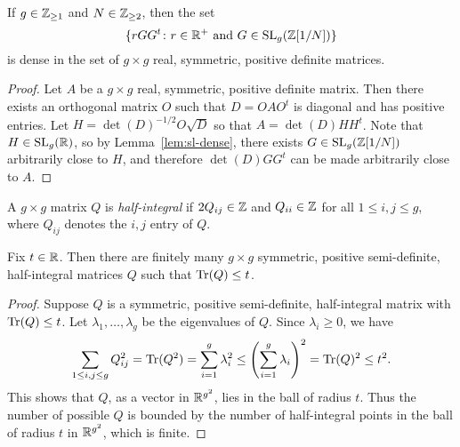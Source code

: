\documentclass{amsart}
\begin{document}
\begin{lemma}\label{lem:rggt-dense}
  If $g\in\mathbb{Z}_{\ge 1}$ and $N\in\mathbb{Z}_{\ge 2}$, then the set
\[
\{ rGG^t \colon r \in \mathbb{R}^+ \text{ and } G \in \operatorname{SL}_g(\mathbb{Z}[1/N]) \}
\]
is dense in the set of $g \times g$ real, symmetric, positive definite matrices.
\end{lemma}
\begin{proof}
  Let $A$ be a $g \times g$ real, symmetric, positive definite matrix. Then there exists an orthogonal matrix $O$ such that $D = OAO^t$ is diagonal and has positive entries. Let $H = \det(D)^{-1/2}O\sqrt{D}$ so that $A = \det(D)HH^t$. Note that $H \in \operatorname{SL}_g(\mathbb{R})$, so by Lemma~\ref{lem:sl-dense}, there exists $G \in \operatorname{SL}_g(\mathbb{Z}[1/N])$ arbitrarily close to $H$, and therefore $\det(D)GG^t$ can be made arbitrarily close to $A$.
\end{proof}

\begin{definition}
  A $g \times g$ matrix $Q$ is \emph{half-integral} if $2Q_{ij} \in \mathbb{Z}$ and $Q_{ii} \in \mathbb{Z}$ for all $1 \leq i,j \leq g$, where $Q_{ij}$ denotes the $i,j$ entry of $Q$.
\end{definition}

\begin{lemma}\label{lem:finite-fixed-trace}
 Fix $t\in\mathbb{R}$. Then there are finitely many $g \times g$ symmetric, positive semi-definite, half-integral matrices $Q$ such that $\operatorname{Tr}(Q) \leq t$.
\end{lemma}
\begin{proof}
  Suppose $Q$ is a symmetric, positive semi-definite, half-integral matrix with $\operatorname{Tr}(Q) \leq t$. Let $\lambda_1,\dots,\lambda_g$ be the eigenvalues of $Q$. Since $\lambda_i \geq 0$, we have
  \[
    \sum_{1 \leq i,j \leq g} Q_{ij}^2 = \operatorname{Tr}(Q^2) = \sum_{i=1}^g \lambda_i^2 \leq \left(\sum_{i=1}^g \lambda_i\right)^2 = \operatorname{Tr}(Q)^2 \leq t^2.
  \]
  This shows that $Q$, as a vector in $\mathbb{R}^{g^2}$, lies in the ball of radius $t$. Thus the number of possible $Q$ is bounded by the number of half-integral points in the ball of radius $t$ in $\mathbb{R}^{g^2}$, which is finite.
\end{proof}
\end{document}
